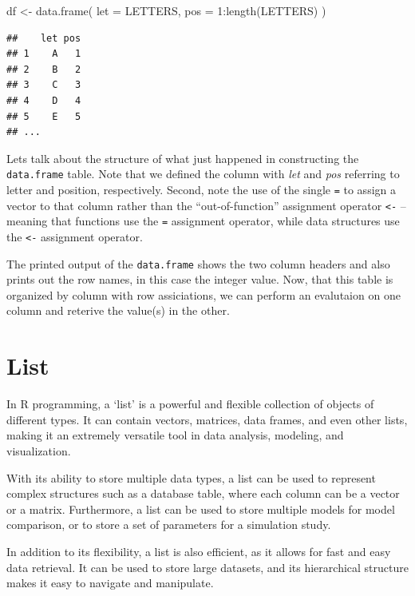 \documentclass[
]{book}
\newenvironment{Shaded}{\begin{snugshade}}{\end{snugshade}}
\newcommand{\AttributeTok}[1]{\textcolor[rgb]{0.77,0.63,0.00}{#1}}
\newcommand{\DecValTok}[1]{\textcolor[rgb]{0.00,0.00,0.81}{#1}}
\newcommand{\FunctionTok}[1]{\textcolor[rgb]{0.00,0.00,0.00}{#1}}
\newcommand{\NormalTok}[1]{#1}
\newcommand{\OtherTok}[1]{\textcolor[rgb]{0.56,0.35,0.01}{#1}}
\newcommand{\SpecialCharTok}[1]{\textcolor[rgb]{0.00,0.00,0.00}{#1}}
\begin{document}
\begin{Shaded}
\begin{Highlighting}[]
\NormalTok{df }\OtherTok{\textless{}{-}} \FunctionTok{data.frame}\NormalTok{(}
  \AttributeTok{let =}\NormalTok{ LETTERS,}
  \AttributeTok{pos =} \DecValTok{1}\SpecialCharTok{:}\FunctionTok{length}\NormalTok{(LETTERS)}
\NormalTok{)}
\end{Highlighting}
\end{Shaded}

\begin{verbatim}
##    let pos
## 1    A   1
## 2    B   2
## 3    C   3
## 4    D   4
## 5    E   5
## ...
\end{verbatim}

Lets talk about the structure of what just happened in constructing the \texttt{data.frame} table. Note that we defined the column with \emph{let} and \emph{pos} referring to letter and position, respectively. Second, note the use of the single \texttt{=} to assign a vector to that column rather than the ``out-of-function'' assignment operator \texttt{\textless{}-} -- meaning that functions use the \texttt{=} assignment operator, while data structures use the \texttt{\textless{}-} assignment operator.

The printed output of the \texttt{data.frame} shows the two column headers and also prints out the row names, in this case the integer value. Now, that this table is organized by column with row assiciations, we can perform an evalutaion on one column and reterive the value(s) in the other.

\hypertarget{list}{%
\section{List}\label{list}}

In R programming, a `list' is a powerful and flexible collection of objects of different types. It can contain vectors, matrices, data frames, and even other lists, making it an extremely versatile tool in data analysis, modeling, and visualization.

With its ability to store multiple data types, a list can be used to represent complex structures such as a database table, where each column can be a vector or a matrix. Furthermore, a list can be used to store multiple models for model comparison, or to store a set of parameters for a simulation study.

In addition to its flexibility, a list is also efficient, as it allows for fast and easy data retrieval. It can be used to store large datasets, and its hierarchical structure makes it easy to navigate and manipulate.
\end{document}
